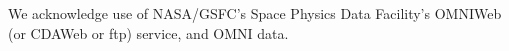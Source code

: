 \documentclass[referee,a4paper,12pt,traditabstract]{swsc}
\begin{document}
\begin{linenumbers}
\begin{acknowledgements}
      We acknowledge use of NASA/GSFC's Space Physics Data Facility's OMNIWeb (or CDAWeb or ftp) service, and OMNI data.
\end{acknowledgements}




\end{linenumbers}
\end{document}
